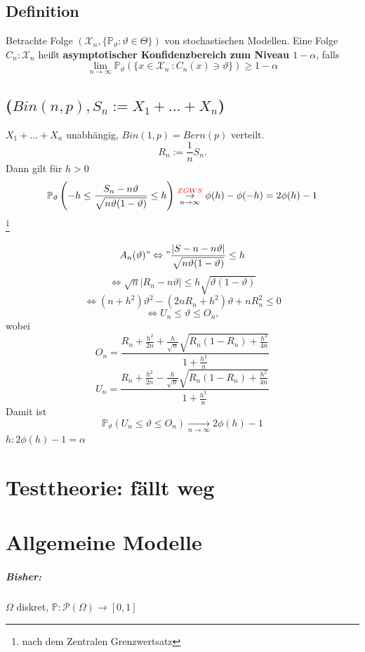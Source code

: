 \documentclass[a4paper,11pt,notitlepage]{report}
\newcommand{\Prim}{{\ensuremath{\mathbb{P}}}}
\begin{document}
\section{Definition}
Betrachte Folge $(\mathcal{X}_n, \{\Prim_\vartheta \colon \vartheta \in \Theta\})$ von stochastischen Modellen. Eine Folge $C_n \colon \mathcal{X}_n$ heißt \textbf{asymptotischer Konfidenzbereich zum Niveau $1 - \alpha$}, falls
$$\lim\limits_{n \rightarrow \infty} \Prim_\vartheta(\{x \in \mathcal{X}_n\ \colon C_n(x) \ni \vartheta\}) \geq 1- \alpha$$

\section{($Bin(n,p), S_n:= X_1 + \ldots + X_n$)}
$X_1 + \ldots + X_n$ unabhängig, $Bin(1,p) = Bern(p)$ verteilt.
$$R_n := \frac{1}{n} S_n.$$
Dann gilt für $h > 0$
$$\Prim_\vartheta \left(-h \leq \frac{S_n - n \vartheta}{\sqrt{n \vartheta (1-\vartheta)}} \leq h \right) \overset{\textcolor{red}{ZGWS}}{\underset{n \rightarrow \infty}{\rightarrow}} \phi(h) - \phi(-h) = 2 \phi(h)-1$$ \footnote{nach dem Zentralen Grenzwertsatz}

$$A_n(\vartheta) "\Leftrightarrow" \frac{|S-n - n \vartheta|}{\sqrt{n \vartheta (1-\vartheta)}} \leq h$$
$$\Leftrightarrow \sqrt{n} |R_n - n \vartheta| \leq h \sqrt{\vartheta (1-\vartheta)}$$
$$\Leftrightarrow (n+h^2) \vartheta^2 - (2n R_n + h^2) \vartheta + n R_n^2 \leq 0$$
$$\Leftrightarrow U_n \leq \vartheta \leq O_n,$$
wobei $$O_n = \frac{R_n + \frac{h^2}{2n} + \frac{h}{\sqrt{n}}\sqrt{R_n (1-R_n) + \frac{h^2}{4n}}}{1+\frac{h^2}{n}}$$
$$U_n = \frac{R_n + \frac{h^2}{2n} - \frac{h}{\sqrt{n}}\sqrt{R_n (1-R_n) + \frac{h^2}{4n}}}{1+\frac{h^2}{n}}$$
Damit ist
$$\Prim_\vartheta(U_n \leq \vartheta \leq O_n) \underset{n \rightarrow \infty}{\rightarrow} 2 \phi(h) - 1$$
$h : 2 \phi(h) - 1 = \alpha$

\chapter{Testtheorie: fällt weg}

\chapter{Allgemeine Modelle}
\paragraph{Bisher:} $\Omega$ diskret, $\Prim \colon \mathcal{P}(\Omega) \rightarrow [0,1]$
\end{document}

